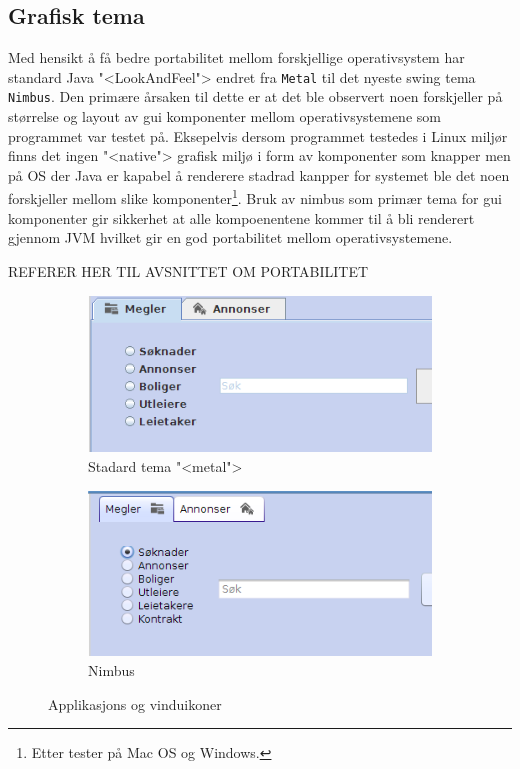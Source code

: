\subsection{Grafisk tema}
Med hensikt å få bedre portabilitet mellom forskjellige operativsystem har standard Java "<LookAndFeel"> endret fra \texttt{Metal} til det nyeste swing tema \texttt{Nimbus}. Den primære årsaken til dette er at det ble observert noen forskjeller på størrelse og layout av gui komponenter mellom operativsystemene som programmet var testet på. Eksepelvis dersom programmet testedes i Linux miljør finns det ingen "<native"> grafisk miljø i form av komponenter som knapper men på OS der Java er kapabel å renderere stadrad kanpper for systemet ble det noen forskjeller mellom slike komponenter\footnote{Etter tester på Mac OS og Windows.}. Bruk av nimbus som primær tema for gui komponenter gir sikkerhet at alle kompoenentene kommer til å bli renderert gjennom JVM hvilket gir en god portabilitet mellom operativsystemene. 

REFERER HER TIL AVSNITTET OM PORTABILITET


\begin{figure}[ht!]
\centering
\begin{subfigure}[b]{0.4\textwidth}
\centering
\includegraphics[scale=0.5]{./img/produktdokumentasjon/visuelle_detaljer/metal.png}
\caption{Stadard tema "<metal">}
\end{subfigure}

\begin{subfigure}[b]{0.4\textwidth}
\centering
\includegraphics[scale=0.5]{./img/produktdokumentasjon/visuelle_detaljer/nimbus.png}
\caption{Nimbus}
\end{subfigure}
\caption{Applikasjons og vinduikoner}\label{fig:tema}
\end{figure}